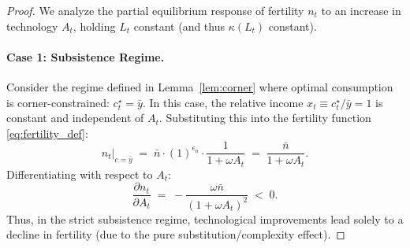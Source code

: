 \documentclass[11pt,a4paper]{article}
\begin{document}
\begin{proof}
  We analyze the partial equilibrium response of fertility \(n_t\) to an increase in technology \(A_t\), holding \(L_t\) constant (and thus \(\kappa(L_t)\) constant).

  \paragraph{Case 1: Subsistence Regime.}
  Consider the regime defined in Lemma~\ref{lem:corner} where optimal consumption is corner-constrained: \(c_t^\star = \bar{y}\). In this case, the relative income \(x_t \equiv c_t^\star/\bar{y} = 1\) is constant and independent of \(A_t\). Substituting this into the fertility function \eqref{eq:fertility_def}:
  \[
    n_t|_{c=\bar{y}} \;=\; \bar{n} \cdot (1)^{\epsilon_n} \cdot \frac{1}{1 + \omega A_t} \;=\; \frac{\bar{n}}{1 + \omega A_t}.
  \]
  Differentiating with respect to \(A_t\):
  \[
    \frac{\partial n_t}{\partial A_t} \;=\; -\frac{\omega \bar{n}}{(1 + \omega A_t)^2} \;<\; 0.
  \]
  Thus, in the strict subsistence regime, technological improvements lead solely to a decline in fertility (due to the pure substitution/complexity effect).


\end{proof}
\end{document}
